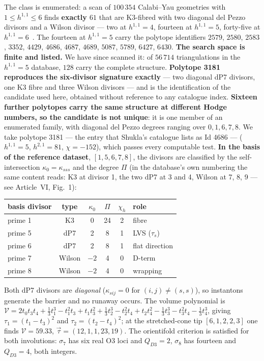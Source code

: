 The class is enumerated: a scan of $100\,354$ Calabi--Yau geometries with $1\leq h^{1,1}\leq6$ finds \textbf{exactly $61$} that are K3-fibred with two diagonal del Pezzo divisors and a Wilson divisor --- two at $h^{1,1}=4$, fourteen at $h^{1,1}=5$, forty-five at $h^{1,1}=6$~\cite{Shukla}. The fourteen at $h^{1,1}=5$ carry the polytope identifiers $2579$, $2580$, $2583$, $3352$, $4429$, $4686$, $4687$, $4689$, $5087$, $5789$, $6427$, $6430$. \textbf{The search space is finite and listed.} We have since scanned it: of $56\,714$ triangulations in the $h^{1,1}=5$ database, $128$ carry the complete structure. \textbf{Polytope 3181 reproduces the six-divisor signature exactly} --- two diagonal dP7 divisors, one K3 fibre and three Wilson divisors --- and is the identification of the candidate used here, obtained without reference to any catalogue index. \textbf{Sixteen further polytopes carry the same structure at different Hodge numbers, so the candidate is not unique}: it is one member of an enumerated family, with diagonal del Pezzo degrees ranging over $0,1,6,7,8$. We take polytope 3181 --- the entry that Shukla's catalogue lists as Id 4686 --- ($h^{1,1}=5$, $h^{2,1}=81$, $\chi=-152$), which passes every computable test. \textbf{In the basis of the reference dataset}, $[1,5,6,7,8]$, the divisors are classified by the self-intersection $\kappa_0=\kappa_{sss}$ and the degree $\Pi$ (in the database's own numbering the same content reads: K3 at divisor 1, the two dP7 at 3 and 4, Wilson at 7, 8, 9 --- see Article~VI, Fig.~1):
\begin{center}\small
\begin{tabular}{lccccl}\toprule
basis divisor & type & $\kappa_0$ & $\Pi$ & $\chi_h$ & role\\\midrule
prime 1&K3&0&24&2&fibre\\
prime 5&dP7&2&8&1&LVS ($\tau_s$)\\
prime 6&dP7&2&8&1&flat direction\\
prime 7&Wilson&$-2$&4&0&D-term\\
prime 8&Wilson&$-2$&4&0&wrapping\\\bottomrule
\end{tabular}
\end{center}
Both dP7 divisors are \emph{diagonal} ($\kappa_{sij}=0$ for $(i,j)\neq(s,s)$), so instantons generate the barrier and no runaway occurs. The volume polynomial is $\mathcal V=2t_0t_3t_4+\tfrac13t_1^3-t_1^2t_3+t_1t_3^2+\tfrac13t_2^3-t_2^2t_4+t_2t_4^2-\tfrac13t_3^3-t_3^2t_4-\tfrac13t_4^3$, giving $\tau_1=(t_1-t_3)^2$ and $\tau_2=(t_2-t_4)^2$; at the stretched-cone tip $[6,1,2,2,3]$ one finds $\mathcal V=59.33$, $\vec\tau=(12,1,1,23,19)$. The orientifold criterion is satisfied for both involutions: $\sigma_7$ has six real O3 loci and $Q_{D3}=2$, $\sigma_8$ has fourteen and $Q_{D3}=4$, both integers.


